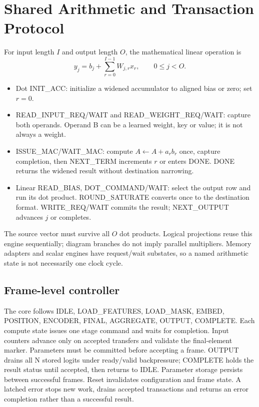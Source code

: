 \documentclass[11pt,a4paper]{article}
\begin{document}
\section{Shared Arithmetic and Transaction Protocol}
For input length $I$ and output length $O$, the mathematical linear operation is
\[
y_j=b_j+\sum_{r=0}^{I-1}W_{j,r}x_r,\qquad 0\leq j<O.
\]
\begin{itemize}
\item Dot INIT\_ACC: initialize a widened accumulator to aligned bias or zero; set $r=0$.
\item READ\_INPUT\_REQ/WAIT and READ\_WEIGHT\_REQ/WAIT: capture both operands. Operand B can be a learned weight, key or value; it is not always a weight.
\item ISSUE\_MAC/WAIT\_MAC: compute $A\leftarrow A+a_rb_r$ once, capture completion, then NEXT\_TERM increments $r$ or enters DONE. DONE returns the widened result without destination narrowing.
\item Linear READ\_BIAS, DOT\_COMMAND/WAIT: select the output row and run its dot product. ROUND\_SATURATE converts once to the destination format. WRITE\_REQ/WAIT commits the result; NEXT\_OUTPUT advances $j$ or completes.
\end{itemize}
The source vector must survive all $O$ dot products. Logical projections reuse this engine sequentially; diagram branches do not imply parallel multipliers. Memory adapters and scalar engines have request/wait substates, so a named arithmetic state is not necessarily one clock cycle.

\subsection{Frame-level controller}
The core follows IDLE, LOAD\_FEATURES, LOAD\_MASK, EMBED, POSITION, ENCODER, FINAL, AGGREGATE, OUTPUT, COMPLETE. Each compute state issues one stage command and waits for completion. Input counters advance only on accepted transfers and validate the final-element marker. Parameters must be committed before accepting a frame. OUTPUT drains all N stored logits under ready/valid backpressure; COMPLETE holds the result status until accepted, then returns to IDLE. Parameter storage persists between successful frames. Reset invalidates configuration and frame state. A latched error stops new work, drains accepted transactions and returns an error completion rather than a successful result.
\end{document}
